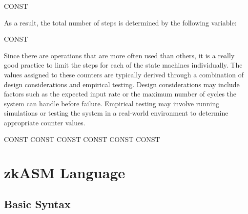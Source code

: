 \begin{zkasm}
    CONST %
\end{zkasm}

As a result, the total number of steps is determined by the following variable:

\begin{zkasm}
    CONST %
\end{zkasm}

Since there are operations that are more often used than others, it is a really good practice to limit the steps for each of the state machines individually. The values assigned to these counters are typically derived through a combination of design considerations and empirical testing. Design considerations may include factors such as the expected input rate or the maximum number of cycles the system can handle before failure. Empirical testing may involve running simulations or testing the system in a real-world environment to determine appropriate counter values.

\begin{zkasm}
    CONST %
    CONST %
    CONST %
    CONST %
    CONST %
    CONST %
\end{zkasm}




















\section{zkASM Language}




\subsection{Basic Syntax}

